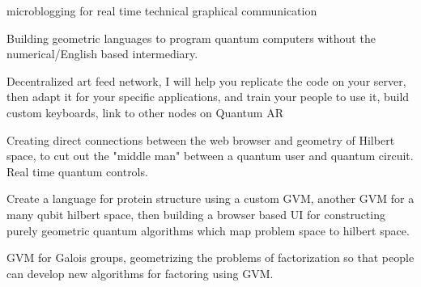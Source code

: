 \documentclass[11pt]{article}
\begin{document}
    microblogging for real time technical graphical communication




    Building geometric languages to program quantum computers without the numerical/English based intermediary.




    Decentralized art feed network, I will help you replicate the code on your server, then adapt it for your specific applications, and train your people to use it, build custom keyboards, link to other nodes on Quantum AR





Creating direct connections between the web browser and geometry of Hilbert space, to cut out the "middle man" between a quantum user and quantum circuit.  Real time quantum controls.    




    Create a language for protein structure using a custom GVM, another GVM for a many qubit hilbert space, then building a browser based UI for constructing purely geometric quantum algorithms which map problem space to hilbert space.  




    GVM for Galois groups, geometrizing the problems of factorization so that people can develop new algorithms for factoring using GVM.




    
\end{document}
